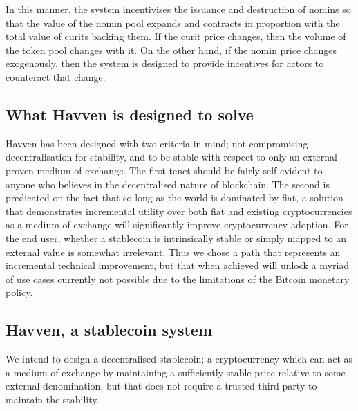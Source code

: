 In this manner, the system incentivises the issuance and destruction of nomins so that the value of
the nomin pool expands and contracts in proportion with the total value of curits backing them.
If the curit price changes, then the volume of the token pool changes with it.
On the other hand, if the nomin price changes exogenously, then the system is designed to provide
incentives for actors to counteract that change. \\

\subsection{What Havven is designed to solve}

\noindent Havven has been designed with two criteria in mind; not compromising decentralisation for stability,
and to be stable with respect to only an external proven medium of exchange.
The first tenet should be fairly self-evident to anyone who believes in the decentralised nature of blockchain.
The second is predicated on the fact that so long as the world is dominated by fiat, a solution that
demonstrates incremental utility over both fiat and existing cryptocurrencies as a medium of exchange will
significantly improve cryptocurrency adoption. For the end user, whether a stablecoin is intrinsically stable
or simply mapped to an external value is somewhat irrelevant.
Thus we chose a path that represents an incremental technical improvement, but that when achieved will
unlock a myriad of use cases currently not possible due to the limitations of the Bitcoin monetary policy. \\

\subsection{Havven, a stablecoin system}

\noindent We intend to design a decentralised stablecoin; a cryptocurrency which can act as a medium of exchange by maintaining a sufficiently stable price relative to some external denomination, but that does not require a trusted third party to maintain the stability.\\

